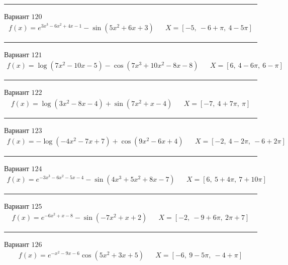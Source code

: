 \documentclass[11pt]{report}
\begin{document}
\begin{center}
    \noindent\rule{8cm}{0.4pt}
\end{center}
Вариант \(120\)
\begin{align*}
    f(x) = e^{3 x^{3} - 6 x^{2} + 4 x - 1} - \sin{\left(5 x^{2} + 6 x + 3 \right)} && X = \left[ -5, \  -6 + \pi, \  4 - 5 \pi\right]
\end{align*}
\begin{center}
    \noindent\rule{8cm}{0.4pt}
\end{center}
Вариант \(121\)
\begin{align*}
    f(x) = \log{\left(7 x^{2} - 10 x - 5 \right)} - \cos{\left(7 x^{3} + 10 x^{2} - 8 x - 8 \right)} && X = \left[ 6, \  4 - 6 \pi, \  6 - \pi\right]
\end{align*}
\begin{center}
    \noindent\rule{8cm}{0.4pt}
\end{center}
Вариант \(122\)
\begin{align*}
    f(x) = \log{\left(3 x^{2} - 8 x - 4 \right)} + \sin{\left(7 x^{2} + x - 4 \right)} && X = \left[ -7, \  4 + 7 \pi, \  \pi\right]
\end{align*}
\begin{center}
    \noindent\rule{8cm}{0.4pt}
\end{center}
Вариант \(123\)
\begin{align*}
    f(x) = - \log{\left(- 4 x^{2} - 7 x + 7 \right)} + \cos{\left(9 x^{2} - 6 x + 4 \right)} && X = \left[ -2, \  4 - 2 \pi, \  -6 + 2 \pi\right]
\end{align*}
\begin{center}
    \noindent\rule{8cm}{0.4pt}
\end{center}
Вариант \(124\)
\begin{align*}
    f(x) = e^{- 3 x^{3} - 6 x^{2} - 5 x - 4} - \sin{\left(4 x^{3} + 5 x^{2} + 8 x - 7 \right)} && X = \left[ 6, \  5 + 4 \pi, \  7 + 10 \pi\right]
\end{align*}
\begin{center}
    \noindent\rule{8cm}{0.4pt}
\end{center}
Вариант \(125\)
\begin{align*}
    f(x) = e^{- 6 x^{2} + x - 8} - \sin{\left(- 7 x^{2} + x + 2 \right)} && X = \left[ -2, \  -9 + 6 \pi, \  2 \pi + 7\right]
\end{align*}
\begin{center}
    \noindent\rule{8cm}{0.4pt}
\end{center}
Вариант \(126\)
\begin{align*}
    f(x) = e^{- x^{2} - 9 x - 6} \cos{\left(5 x^{2} + 3 x + 5 \right)} && X = \left[ -6, \  9 - 5 \pi, \  -4 + \pi\right]
\end{align*}
\end{document}
